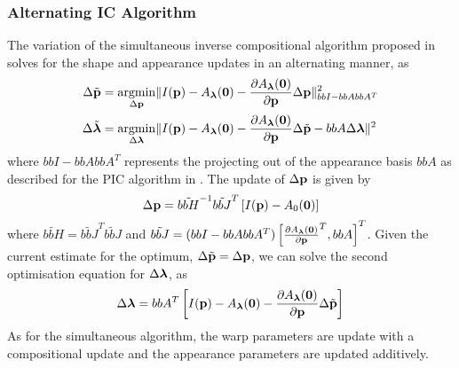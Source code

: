 \subsubsection{Alternating IC Algorithm}\label{subsec:aam-alternating}
The variation of the simultaneous inverse compositional algorithm proposed in
\cite{matthews2004active} solves for the shape and appearance updates in an
alternating manner, as
\begin{equation}
    \begin{aligned}\label{eq:aam-alternating}
        \Delta \tilde{\p} &=       \argmin_{\Delta \p}       \norm{I(\p) - A_{\blambda}(\zero) - \frac{\partial A_{\blambda}(\zero)}{\partial \p} \Delta \p}^2_{bb{I} - bb{A} bb{A}^T} \\
        \Delta \tilde{\blambda} &= \argmin_{\Delta \blambda} \norm{I(\p) - A_{\blambda}(\zero) - \frac{\partial A_{\blambda}(\zero)}{\partial \p} \Delta \tilde{\p} - bb{A} \Delta \blambda}^2
    \end{aligned}
\end{equation}
where $bb{I} - bb{A} bb{A}^T$ represents the
projecting out of the appearance basis $bb{A}$ as described for the PIC
algorithm in \cite{RefWorks:227}. The update of $\Delta \boldsymbol{\mathbf{p}}$ is given by
\begin{equation}\label{eq:aam-alternating-deltap-update}
        \Delta \boldsymbol{\mathbf{p}} = {\tilde{bb{H}}}^{-1} {\tilde{bb{J}}}^{T} \left[ I(\boldsymbol{\mathbf{p}}) - A_0(\boldsymbol{\mathbf{0}}) \right]
\end{equation}
where ${\tilde{bb{H}}} = {\tilde{bb{J}}}^{T}
\tilde{bb{J}}$ and $\tilde{bb{J}} = (bb{I} -
bb{A} bb{A}^T) \left[ {\frac{\partial
A_{\boldsymbol{\mathbf{\lambda}}}(\boldsymbol{\mathbf{0}})}{\partial \boldsymbol{\mathbf{p}}}}^T, bb{A} \right]^T$. Given the
current estimate for the optimum, $\Delta \tilde{\boldsymbol{\mathbf{p}}} = \Delta \boldsymbol{\mathbf{p}}$, we can solve
the second optimisation equation for $\Delta \boldsymbol{\mathbf{\lambda}}$, as
\begin{equation}\label{eq:aam-alternating-deltalambda-update}
        \Delta \boldsymbol{\mathbf{\lambda}} = bb{A}^T \left[ I(\boldsymbol{\mathbf{p}}) - A_{\boldsymbol{\mathbf{\lambda}}}(\boldsymbol{\mathbf{0}}) - \frac{\partial A_{\boldsymbol{\mathbf{\lambda}}}(\boldsymbol{\mathbf{0}})}{\partial \boldsymbol{\mathbf{p}}} \Delta \tilde{\boldsymbol{\mathbf{p}}} \right]
\end{equation}
As for the simultaneous algorithm, the warp parameters are update with a
compositional update and the appearance parameters are updated additively.
